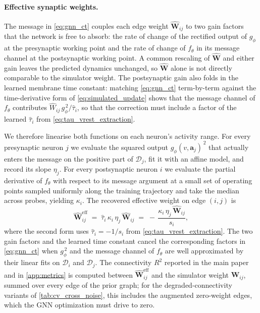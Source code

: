 \documentclass{article}
\begin{document}
\paragraph{Effective synaptic weights.}
The message in \cref{eq:gnn_ct} couples each edge weight
$\hat{\mathbf{W}}_{ij}$ to two gain factors that the network is
free to absorb: the rate of change of the rectified output of
$g_\phi$ at the presynaptic working point and the rate of change of
$f_\theta$ in its message channel at the postsynaptic working
point. A common rescaling of $\hat{\mathbf{W}}$ and either gain
leaves the predicted dynamics unchanged, so $\hat{\mathbf{W}}$
alone is not directly comparable to the simulator weight. The
postsynaptic gain also folds in the learned membrane time constant:
matching \cref{eq:gnn_ct} term-by-term against the time-derivative
form of \cref{eq:simulated_update} shows that the message channel
of $f_\theta$ contributes $\hat W_{ij}\,g_\phi^{\,2}/\hat\tau_i$,
so that the correction must include a factor of the learned
$\hat\tau_i$ from \cref{eq:tau_vrest_extraction}.

We therefore linearise both functions on each neuron's activity
range. For every presynaptic neuron $j$ we evaluate the squared
output $g_\phi(v,\mathbf{a}_j)^{\,2}$ that actually enters the
message on the positive part of $\mathcal{D}_j$, fit it with an
affine model, and record its slope $\eta_j$. For every postsynaptic
neuron $i$ we evaluate the partial derivative of $f_\theta$ with
respect to its message argument at a small set of operating points
sampled uniformly along the training trajectory and take the
median across probes, yielding $\kappa_i$. The recovered effective
weight on edge $(i,j)$ is
\begin{equation}
    \hat{\mathbf{W}}^{\mathrm{eff}}_{ij}
    \;=\;
    \hat{\tau}_i\,\kappa_i\,\eta_j\,\hat{\mathbf{W}}_{ij}
    \;=\;
    -\,\frac{\kappa_i\,\eta_j\,\hat{\mathbf{W}}_{ij}}{s_i},
    \label{eq:weight_extraction}
\end{equation}
where the second form uses $\hat\tau_i = -1/s_i$ from
\cref{eq:tau_vrest_extraction}. The two gain factors and the
learned time constant cancel the corresponding factors in
\cref{eq:gnn_ct} when $g_\phi^{\,2}$ and the message channel of
$f_\theta$ are well approximated by their linear fits on
$\mathcal{D}_i$ and $\mathcal{D}_j$. The connectivity $R^2$
reported in the main paper and in \cref{app:metrics} is
computed between $\hat{\mathbf{W}}^{\mathrm{eff}}_{ij}$ and the simulator
weight $\mathbf{W}_{ij}$, summed over every edge of the prior
graph; for the degraded-connectivity variants of
\cref{tab:cv_cross_noise}, this includes the augmented
zero-weight edges, which the GNN optimization must drive to zero.
\end{document}
